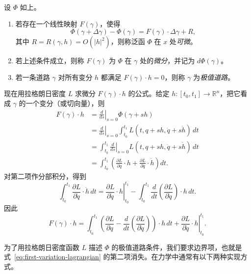 \begin{definition}
\label{def:functional-differentiability}
设 $\Phi$ 如上。
\begin{enumerate}[label=(\arabic*)]
  \item 若存在一个线性映射 $F(\gamma)$，使得
  \begin{equation}\label{eq:differentiable-functional}
    \Phi(\gamma+\Delta\gamma)-\Phi(\gamma)
    =F(\gamma)\cdot\Delta\gamma+R,
  \end{equation}
  其中 $R=R(\gamma,h)=O(|h|^2)$，则称泛函 $\Phi$ 在 $x$ 处\emph{可微}。
  \item 若上述条件成立，则称 $F(\gamma)$ 为 $\Phi$ 在 $\gamma$ 处的\emph{微分}，并记为 $d\Phi(\gamma)$。
  \item 若一条道路 $\gamma$ 对所有变分 $h$ 都满足 $F(\gamma)\cdot h=0$，则称 $\gamma$ 为\emph{极值道路}。
\end{enumerate}
\end{definition}

现在用拉格朗日密度 $L$ 求微分 $F(\gamma)\cdot h$ 的公式。给定 $h:[t_0,t_1]\to\mathbb R^n$，把它看成 $\gamma$ 的一个变分（或切向量），则
\begin{align*}
  F(\gamma)\cdot h
  &=\left.\frac d{ds}\right|_{s=0}\Phi(\gamma+sh)\\
  &=\left.\frac d{ds}\right|_{s=0}
    \int_{t_0}^{t_1}L(t,q+sh,\dot q+s\dot h)\,dt\\
  &=\int_{t_0}^{t_1}\left.\frac d{ds}\right|_{s=0}
    L(t,q+sh,\dot q+s\dot h)\,dt\\
  &=\int_{t_0}^{t_1}\left(
    \frac{\partial L}{\partial q}\cdot h
    +\frac{\partial L}{\partial\dot q}\cdot\dot h
  \right)dt.
\end{align*}
对第二项作分部积分，得到
\[
  \int_{t_0}^{t_1}\frac{\partial L}{\partial\dot q}\cdot\dot h\,dt
  =\left.\frac{\partial L}{\partial\dot q}\cdot h\right|_{t_0}^{t_1}
  -\int_{t_0}^{t_1}\frac d{dt}\left(\frac{\partial L}{\partial\dot q}\right)\cdot h\,dt.
\]
因此
\begin{equation}\label{eq:first-variation-lagrangian}
  F(\gamma)\cdot h
  =\int_{t_0}^{t_1}\left(
    \frac{\partial L}{\partial q}
    -\frac d{dt}\left(\frac{\partial L}{\partial\dot q}\right)
  \right)\cdot h\,dt
  +\left.\frac{\partial L}{\partial\dot q}\cdot h\right|_{t_0}^{t_1}.
\end{equation}

为了用拉格朗日密度函数 $L$ 描述 $\Phi$ 的极值道路条件，我们要求边界项，也就是式~\eqref{eq:first-variation-lagrangian} 的第二项消失。在力学中通常有以下两种实现方式。

